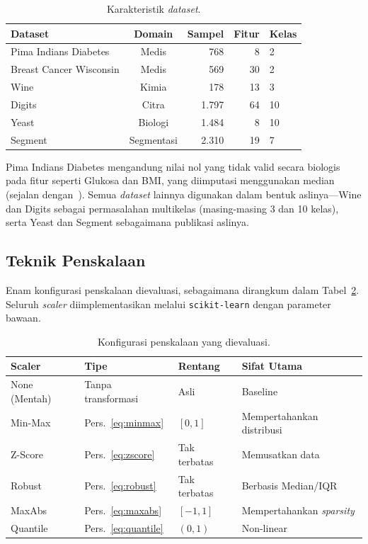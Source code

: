 \documentclass[12pt,a4paper]{article}
\begin{document}
\begin{table}[ht]
\centering
\caption{Karakteristik \textit{dataset}.}
\label{tbl:datasets}
\begin{tabular}{lcrrl}
\toprule
Dataset & Domain & Sampel & Fitur & Kelas \\
\midrule
Pima Indians Diabetes  & Medis      & 768  &  8 & 2 \\
Breast Cancer Wisconsin & Medis     & 569  & 30 & 2 \\
Wine                   & Kimia      & 178  & 13 & 3 \\
Digits                 & Citra      & 1.797& 64 & 10 \\
Yeast                  & Biologi    & 1.484&  8 & 10 \\
Segment                & Segmentasi & 2.310& 19 & 7 \\
\bottomrule
\end{tabular}
\end{table}

Pima Indians Diabetes mengandung nilai nol yang tidak valid secara biologis
pada fitur seperti Glukosa dan BMI, yang diimputasi menggunakan median
(sejalan dengan~\cite{pristyanto2022diabetes}). Semua \textit{dataset} lainnya
digunakan dalam bentuk aslinya---Wine dan Digits sebagai permasalahan multikelas
(masing-masing 3 dan 10 kelas), serta Yeast dan Segment sebagaimana publikasi aslinya.

\subsection{Teknik Penskalaan}
\label{sec:scalers}

Enam konfigurasi penskalaan dievaluasi, sebagaimana dirangkum dalam
Tabel~\ref{tbl:scaler-config}. Seluruh \textit{scaler} diimplementasikan melalui
\texttt{scikit-learn} dengan parameter bawaan.

\begin{table}[ht]
\centering
\caption{Konfigurasi penskalaan yang dievaluasi.}
\label{tbl:scaler-config}
\begin{tabular}{llll}
\toprule
Scaler & Tipe & Rentang & Sifat Utama \\
\midrule
None (Mentah) & Tanpa transformasi & Asli & Baseline \\
Min-Max    & Pers.~\eqref{eq:minmax} & $[0, 1]$    & Mempertahankan distribusi \\
Z-Score    & Pers.~\eqref{eq:zscore} & Tak terbatas & Memusatkan data \\
Robust     & Pers.~\eqref{eq:robust} & Tak terbatas & Berbasis Median/IQR \\
MaxAbs     & Pers.~\eqref{eq:maxabs} & $[-1, 1]$   & Mempertahankan \textit{sparsity} \\
Quantile   & Pers.~\eqref{eq:quantile} & $(0, 1)$ & Non-linear \\
\bottomrule
\end{tabular}
\end{table}
\end{document}
